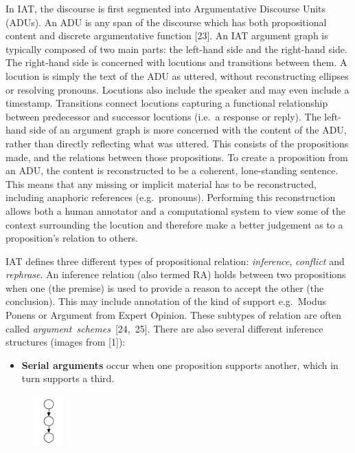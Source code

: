 \documentclass[twocolumn]{article}
\providecommand{\tightlist}{%
  \setlength{\itemsep}{0pt}\setlength{\parskip}{0pt}}
\begin{document}
In IAT, the discourse is first segmented into Argumentative Discourse
Units (ADUs). An ADU is any span of the discourse which has both
propositional content and discrete argumentative function {[}23{]}. An
IAT argument graph is typically composed of two main parts: the
left-hand side and the right-hand side. The right-hand side is concerned
with locutions and transitions between them. A locution is simply the
text of the ADU as uttered, without reconstructing ellipses or resolving
pronouns. Locutions also include the speaker and may even include a
timestamp. Transitions connect locutions capturing a functional
relationship between predecessor and successor locutions (i.e.~a
response or reply). The left-hand side of an argument graph is more
concerned with the content of the ADU, rather than directly reflecting
what was uttered. This consists of the propositions made, and the
relations between those propositions. To create a proposition from an
ADU, the content is reconstructed to be a coherent, lone-standing
sentence. This means that any missing or implicit material has to be
reconstructed, including anaphoric references (e.g.~pronouns).
Performing this reconstruction allows both a human annotator and a
computational system to view some of the context surrounding the
locution and therefore make a better judgement as to a proposition's
relation to others.

IAT defines three different types of propositional relation:
\emph{inference}, \emph{conflict} and \emph{rephrase}. An inference
relation (also termed RA) holds between two propositions when one (the
premise) is used to provide a reason to accept the other (the
conclusion). This may include annotation of the kind of support
e.g.~Modus Ponens or Argument from Expert Opinion. These subtypes of
relation are often called \mbox{\emph{argument schemes} {[}24, 25{]}.}
There are also several different inference structures (images from
{[}1{]}):

\begin{itemize}
\tightlist
\item
  \textbf{Serial arguments} occur when one proposition supports another,
  which in turn supports a third.
\end{itemize}

\begin{figure}[H]
    \centering
    \includegraphics[height=2cm]{serial}
\end{figure}
\end{document}
